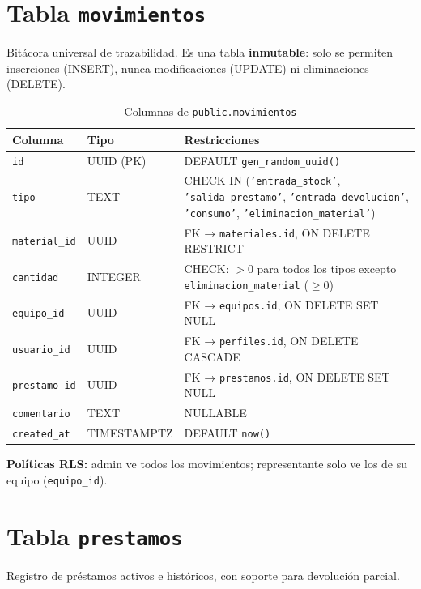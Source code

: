 \documentclass[12pt,a4paper,oneside]{report}
\newcommand{\file}[1]{\texttt{\color{cecyteDark}#1}}
\begin{document}
\section{Tabla \texttt{movimientos}}

Bitácora universal de trazabilidad. Es una tabla \textbf{inmutable}: solo se permiten inserciones (INSERT), nunca modificaciones (UPDATE) ni eliminaciones (DELETE).

\begin{table}[H]
\centering
\caption{Columnas de \file{public.movimientos}}
\begin{tabular}{@{}L{3.5cm}L{4cm}L{8cm}@{}}
\toprule
{}
\textbf{Columna} & \textbf{Tipo} & \textbf{Restricciones} \\
\midrule
\file{id}          & UUID (PK) & DEFAULT \file{gen\_random\_uuid()} \\
\file{tipo}        & TEXT      & CHECK IN (\file{'entrada\_stock'}, \file{'salida\_prestamo'}, \file{'entrada\_devolucion'}, \file{'consumo'}, \file{'eliminacion\_material'}) \\
\file{material\_id} & UUID     & FK → \file{materiales.id}, ON DELETE RESTRICT \\
\file{cantidad}    & INTEGER   & CHECK: \(>0\) para todos los tipos excepto \file{eliminacion\_material} (\(\ge 0\)) \\
\file{equipo\_id}  & UUID      & FK → \file{equipos.id}, ON DELETE SET NULL \\
\file{usuario\_id}  & UUID      & FK → \file{perfiles.id}, ON DELETE CASCADE \\
\file{prestamo\_id} & UUID      & FK → \file{prestamos.id}, ON DELETE SET NULL \\
\file{comentario}   & TEXT      & NULLABLE \\
\file{created\_at}   & TIMESTAMPTZ& DEFAULT \file{now()} \\
\bottomrule
\end{tabular}
\end{table}

\textbf{Políticas RLS:} admin ve todos los movimientos; representante solo ve los de su equipo (\file{equipo\_id}).

\section{Tabla \texttt{prestamos}}

Registro de préstamos activos e históricos, con soporte para devolución parcial.
\end{document}

